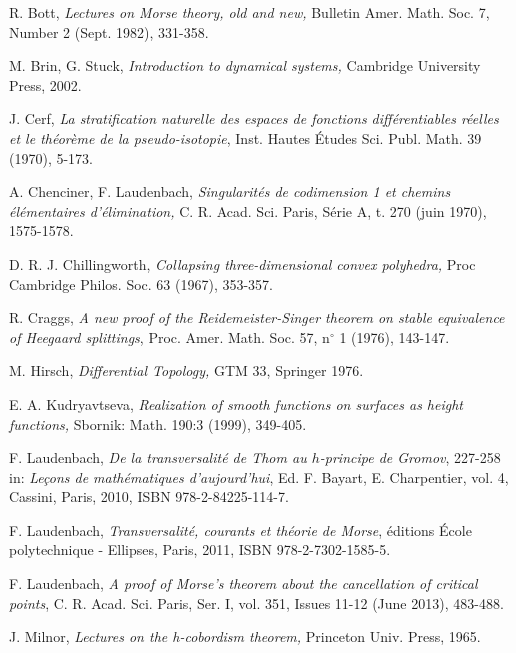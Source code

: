 \documentclass[12pt]{amsart}
\begin{document}
\begin{thebibliography}{99}
 R. Bott, {\it Lectures on Morse theory, old and new,} Bulletin Amer. Math. Soc. 7, Number 2 (Sept.
1982), 331-358.

M. Brin, G. Stuck, {\it Introduction to dynamical systems,} Cambridge University Press,
2002.

 J. Cerf, {\it La stratification naturelle
des espaces de fonctions diff\'erentiables r\'eelles et le th\'eor\`eme
de la pseudo-isotopie},  Inst. Hautes \'Etudes Sci. Publ. Math.  
39 (1970), 5-173. 

 A. Chenciner, F. Laudenbach, {\it Singularit\'es de codimension 1 et chemins \'el\'ementaires d'\'elimination, } C. R. Acad. Sci. Paris, S\'erie A,  t. 270 (juin 1970), 1575-1578.

 D. R. J. Chillingworth, {\it Collapsing three-dimensional convex polyhedra,} Proc Cambridge Philos. Soc. 63 (1967), 353-357.

 R. Craggs, {\it A new proof of the Reidemeister-Singer theorem on stable equivalence  of Heegaard splittings},  Proc. Amer. Math. Soc. 57, n$^\circ$ 1 (1976), 143-147.

 M. Hirsch, {\it Differential Topology,} GTM 33, Springer 1976.

 E. A. Kudryavtseva, {\it Realization of smooth functions on surfaces as height functions,}
 Sbornik: Math.  190:3 (1999), 349-405.
 
 F. Laudenbach, {\it De la transversalit\'e de Thom au $h$-principe de Gromov},
 227-258 in: {\it Le\c cons de math\'ematiques d'aujourd'hui},  Ed. F. Bayart, E. Charpentier, vol. 4,
 Cassini, Paris, 2010, ISBN 978-2-84225-114-7.
 
  F. Laudenbach, {\it Transversalit\'e, courants et th\'eorie de Morse}, \'editions
  \'Ecole polytechnique - Ellipses,  Paris, 2011, ISBN 978-2-7302-1585-5.
 
  F. Laudenbach, {\it A proof of 
 Morse's theorem about the cancellation of critical points},
 C. R. Acad. Sci. Paris, Ser. I, vol. 351, Issues 11-12 (June  2013), 483-488.
 
   J. Milnor, {\it  Lectures on the h-cobordism theorem,} 
Princeton Univ. Press, 1965.


\end{thebibliography}
\end{document}
